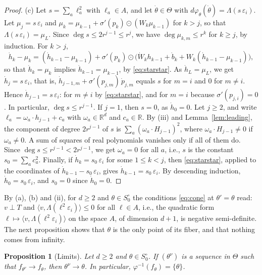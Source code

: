 \documentclass[11pt]{article}
\newtheorem{proposition}[lemma]{Proposition}
\theoremstyle{definition}
\theoremstyle{remark}
\newcommand{\R}{\mathbb{R}}
\begin{document}
\begin{proof}
(c) Let $s=\sum_a\ell_a^2$ with $\ell_a\in A$, and let $\dot\theta\in\Theta$ with $d\varphi_\theta(\dot\theta)=\Lambda(s\,\varepsilon_i)$. Let $\mu_j=s\,\varepsilon_i$ and $\mu_k=\mu_{k-1}+\sigma'(p_k)\odot(W_k\mu_{k-1})$ for $k>j$, so that $\Lambda(s\,\varepsilon_i)=\mu_L$. Since $\deg s\le2r^{j-1}\le r^j$, we have $\deg\mu_{k,m}\le r^k$ for $k\ge j$, by induction. For $k>j$,
\[
\dot h_k-\mu_k=(\dot h_{k-1}-\mu_{k-1})+\sigma'(p_k)\odot\big(\dot W_kh_{k-1}+\dot b_k+W_k(\dot h_{k-1}-\mu_{k-1})\big),
\]
so that $\dot h_k=\mu_k$ implies $\dot h_{k-1}=\mu_{k-1}$, by \eqref{eq:starstar}. As $\dot h_L=\mu_L$, we get $\dot h_j=s\,\varepsilon_i$, that is, $\dot h_{j-1,m}+\sigma'(p_{j,m})\,\dot p_{j,m}$ equals $s$ for $m=i$ and $0$ for $m\ne i$. Hence $\dot h_{j-1}=s\,\varepsilon_i$: for $m\ne i$ by \eqref{eq:starstar}, and for $m=i$ because $\sigma'(p_{j,i})=0$. In particular, $\deg s\le r^{j-1}$. If $j=1$, then $s=0$, as $\dot h_0=0$. Let $j\ge2$, and write $\ell_a=\omega_a\cdot h_{j-1}+c_a$ with $\omega_a\in\R^d$ and $c_a\in\R$. By (iii) and Lemma~\ref{lem:leading}, the component of degree $2r^{j-1}$ of $s$ is $\sum_a(\omega_a\cdot H_{j-1})^2$, where $\omega_a\cdot H_{j-1}\ne0$ if $\omega_a\ne0$. A sum of squares of real polynomials vanishes only if all of them do. Since $\deg s\le r^{j-1}<2r^{j-1}$, we get $\omega_a=0$ for all $a$, i.e., $s$ is the constant $s_0=\sum_ac_a^2$. Finally, if $\dot h_k=s_0\,\varepsilon_i$ for some $1\le k<j$, then \eqref{eq:starstar}, applied to the coordinates of $\dot h_{k-1}-s_0\,\varepsilon_i$, gives $\dot h_{k-1}=s_0\,\varepsilon_i$. By descending induction, $\dot h_0=s_0\,\varepsilon_i$, and $s_0=0$ since $\dot h_0=0$.
\end{proof}

By (a), (b) and (ii), for $d\ge2$ and $\theta\in S_0^\circ$ the conditions \eqref{eq:cone} at $\theta'=\theta$ read: $v\perp T$ and $\langle v,\Lambda(\ell^2\varepsilon_i)\rangle\le0$ for all $\ell\in A$, i.e., the quadratic form $\ell\mapsto\langle v,\Lambda(\ell^2\varepsilon_i)\rangle$ on the space $A$, of dimension $d+1$, is negative semi-definite. The next proposition shows that $\theta$ is the only point of its fiber, and that nothing comes from infinity.

\begin{proposition}[Limits]\label{prop:proper}
Let $d\ge2$ and $\theta\in S_0^\circ$. If $(\theta^\nu)$ is a sequence in $\Theta$ such that $f_{\theta^\nu}\to f_\theta$, then $\theta^\nu\to\theta$. In particular, $\varphi^{-1}(f_\theta)=\{\theta\}$.
\end{proposition}
\end{document}
